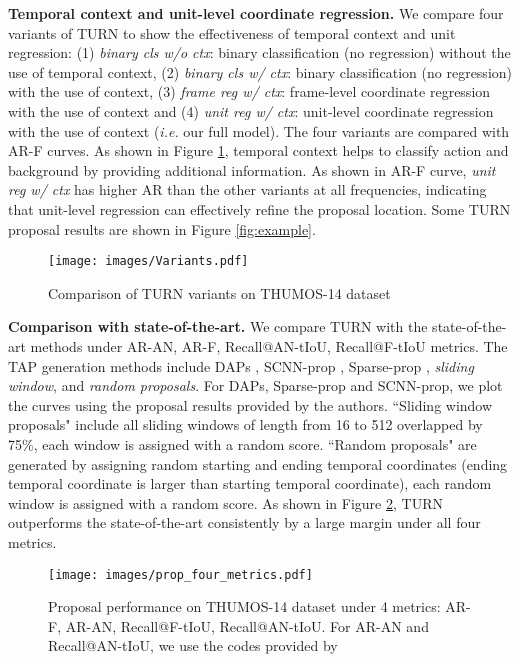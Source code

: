 \documentclass[10pt,twocolumn,letterpaper]{article}
\begin{document}
\textbf{Temporal context and unit-level coordinate regression.} We compare four variants of TURN to show the effectiveness of temporal context and unit regression: (1) \textit{binary cls w/o ctx}: binary classification (no regression) without the use of temporal context, (2) \textit{binary cls w/ ctx}: binary classification (no regression) with the use of context, (3) \textit{frame reg w/ ctx}: frame-level coordinate regression with the use of context and (4) \textit{unit reg w/ ctx}: unit-level coordinate regression with the use of context (\emph{i.e.} our full model). The four variants are compared with AR-F curves. As shown in Figure \ref{fig:compare_variant}, temporal context helps to classify action and background by providing additional information. As shown in AR-F curve, \textit{unit reg w/ ctx} has higher AR than the other variants at all frequencies, indicating that unit-level regression can effectively refine the proposal location. Some TURN proposal results are shown in Figure \ref{fig:example}.

\begin{figure}[]

  \centering
    \texttt{[image: images/Variants.pdf]}
    \caption{Comparison of TURN variants on THUMOS-14 dataset}
      \label{fig:compare_variant}
\end{figure}

\textbf{Comparison with state-of-the-art.} We compare TURN with the state-of-the-art methods under AR-AN, AR-F, Recall@AN-tIoU, Recall@F-tIoU metrics. The TAP generation methods include DAPs \cite{escorcia2016daps}, SCNN-prop \cite{Shou_2016_CVPR}, Sparse-prop \cite{Heilbron_2016_CVPR}, \textit{sliding window}, and \textit{random proposals}. For DAPs, Sparse-prop and SCNN-prop, we plot the curves using the proposal results provided by the authors. ``Sliding window proposals" include all sliding windows of length from 16 to 512 overlapped by 75\%, each window is assigned with a random score. ``Random proposals" are generated by assigning random starting and ending temporal coordinates (ending temporal coordinate is larger than starting temporal coordinate), each random window is assigned with a random score. As shown in Figure \ref{fig:compare_six}, TURN outperforms the state-of-the-art consistently by a large margin under all four metrics.

\begin{figure}[]
   \centering
    \texttt{[image: images/prop\_four\_metrics.pdf]}
    \caption{Proposal performance on THUMOS-14 dataset under 4 metrics: AR-F, AR-AN, Recall@F-tIoU, Recall@AN-tIoU. For AR-AN and Recall@AN-tIoU, we use the codes provided by \cite{escorcia2016daps}}
     \label{fig:compare_six}
\end{figure}
\end{document}
